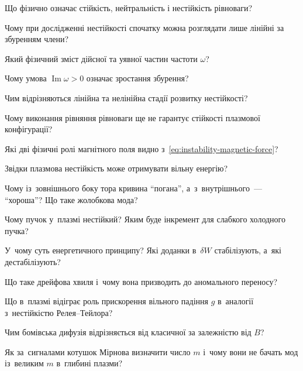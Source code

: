 \begin{Questions}
\begin{quizlist}

\item Що фізично означає стійкість, нейтральність і нестійкість
рівноваги?

\item Чому при дослідженні нестійкості спочатку можна розглядати
лише лінійні за збуренням члени?

\item Який фізичний зміст дійсної та уявної частин частоти
$\omega$?

\item Чому умова $\operatorname{Im}\omega>0$ означає зростання
збурення?

\item Чим відрізняються лінійна та нелінійна стадії розвитку
нестійкості?

\item Чому виконання рівняння рівноваги ще не гарантує стійкості
плазмової конфігурації?

\item Які дві фізичні ролі магнітного поля видно з~\eqref{eq:instability-magnetic-force}?

\item Звідки плазмова нестійкість може отримувати вільну енергію?

\item Чому із~зовнішнього боку тора кривина \enquote{погана}, а~з~внутрішнього~--- \enquote{хороша}? Що таке жолобкова мода?

\item Чому пучок у~плазмі нестійкий? Яким буде інкремент для слабкого холодного пучка?

\item У~чому суть енергетичного принципу? Які доданки в~$\delta W$ стабілізують, а~які дестабілізують?

\item Що таке дрейфова хвиля і~чому вона призводить до аномального переносу?

\item Що в~плазмі відіграє роль прискорення вільного падіння $g$ в~аналогії з~нестійкістю Релея--Тейлора?

\item Чим бомівська дифузія відрізняється від класичної за залежністю від $B$?

\item Як за~сигналами котушок Мірнова визначити число $m$ і~чому вони не бачать мод із~великим $m$ в~глибині плазми?

\end{quizlist}
\end{Questions}

